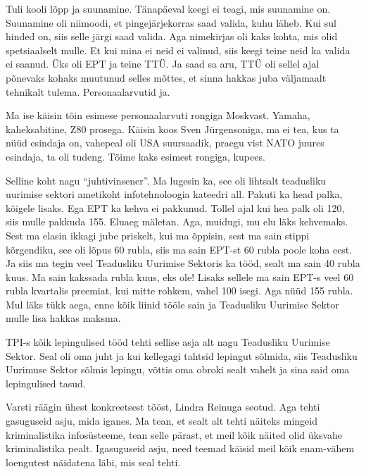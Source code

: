 
Tuli kooli lõpp ja suunamine. Tänapäeval keegi ei teagi, mis suunamine on. Suunamine oli niimoodi, et pingejärjekorras saad valida, kuhu läheb. Kui sul hinded on, siis selle järgi saad valida. Aga  nimekirjas oli kaks kohta, mis olid spetsiaalselt mulle. Et kui mina ei neid ei valinud, siis keegi teine neid ka valida ei saanud. Üks oli EPT ja teine TTÜ. Ja saad sa aru, TTÜ oli sellel ajal põnevaks kohaks muutunud selles mõttes, et sinna hakkas juba väljamaalt tehnikalt tulema. Personaalarvutid ja. 

Ma ise käisin tõin esimese personaalarvuti rongiga Moskvast. Yamaha, kaheksabitine, Z80 prosega. Käisin koos  Sven Jürgensoniga, ma ei tea, kus ta nüüd esindaja on, vahepeal oli USA suursaadik, praegu vist NATO juures esindaja, ta oli tudeng. Tõime kaks esimest rongiga,  kupees. 


Selline koht nagu \enquote{juhtivinsener}. Ma lugesin ka, see oli lihtsalt teadusliku uurimise sektori ametikoht infotehnoloogia kateedri all. Pakuti ka head palka, kõigele lisaks. Ega EPT ka kehva ei pakkunud. Tollel ajal kui hea palk oli 120, siis mulle pakkuda 155. Eluaeg mäletan. Aga,  muidugi, mu elu läks kehvemaks. Sest ma elasin ikkagi jube priskelt, kui ma õppisin, sest ma sain stippi kõrgendiku, see oli lõpus 60 rubla, siis ma sain EPT-st 60 rubla poole koha eest. Ja siis ma tegin veel Teadusliku Uurimise Sektoris ka tööd, sealt ma sain 40 rubla kuus. Ma sain kakssada rubla kuus, eks ole! Lisaks sellele ma sain EPT-s veel 60 rubla kvartalis preemiat, kui mitte rohkem, vahel 100 isegi. Aga nüüd 155 rubla. Mul läks tükk aega, enne kõik liinid tööle sain ja Teadusliku Uurimise Sektor mulle lisa hakkas maksma. 


TPI-s kõik lepingulised tööd tehti sellise asja alt nagu Teadusliku Uurimise Sektor. Seal oli oma juht ja kui kellegagi tahtsid lepingut sõlmida, siis Teadusliku Uurimuse Sektor sõlmis lepingu, võttis oma obroki sealt vahelt ja sina said oma lepingulised tasud. 


Varsti räägin ühest konkreetsest tööst, Lindra Reinuga seotud. Aga tehti gasuguseid asju, mida iganes. Ma tean, et sealt alt tehti näiteks mingeid kriminalistika infosüsteeme, tean selle pärast, et meil kõik näited olid üksvahe kriminalistika pealt. Igasuguseid asju, need teemad käisid meil kõik enam-vähem loengutest näidatena läbi, mis seal tehti. 

